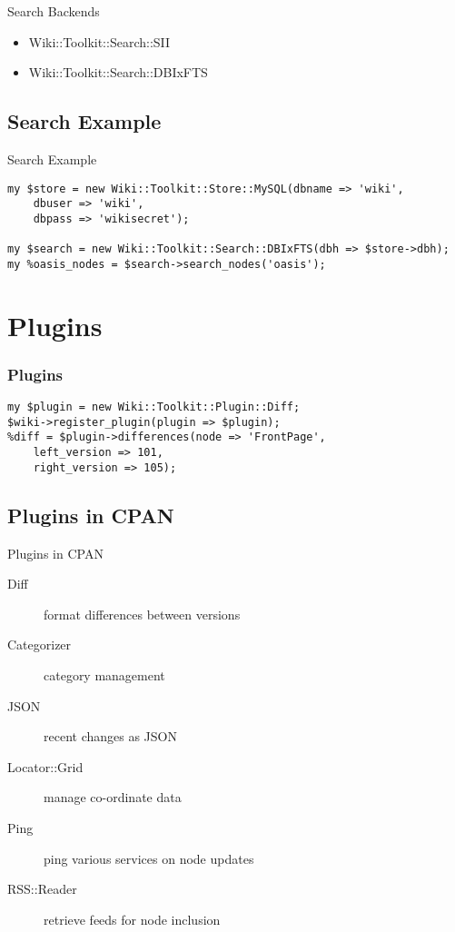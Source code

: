 \begin{frame}{Search Backends}
 \begin{itemize}
  \item Wiki::Toolkit::Search::SII
  \item Wiki::Toolkit::Search::DBIxFTS
 \end{itemize}
\end{frame}
\subsection{Search Example}


\begin{frame}[fragile]{Search Example}
\begin{lstlisting}
my $store = new Wiki::Toolkit::Store::MySQL(dbname => 'wiki',
    dbuser => 'wiki',
    dbpass => 'wikisecret');

my $search = new Wiki::Toolkit::Search::DBIxFTS(dbh => $store->dbh);
my %oasis_nodes = $search->search_nodes('oasis');
\end{lstlisting}
\end{frame}

\section{Plugins}


\begin{frame}[fragile]
\frametitle{Plugins}
\begin{lstlisting}
my $plugin = new Wiki::Toolkit::Plugin::Diff;
$wiki->register_plugin(plugin => $plugin);
%diff = $plugin->differences(node => 'FrontPage',
    left_version => 101,
    right_version => 105);
\end{lstlisting}
\end{frame}

\subsection{Plugins in CPAN}

\begin{frame}{Plugins in CPAN}
 \begin{description}
  \item[Diff] format differences between versions
  \item[Categorizer] category management
  \item[JSON] recent changes as JSON
  \item[Locator::Grid] manage co-ordinate data
  \item[Ping] ping various services on node updates
  \item[RSS::Reader] retrieve feeds for node inclusion
 \end{description}
\end{frame}


